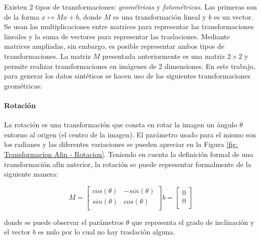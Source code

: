 			Existen 2 tipos de transformaciones: \textit{geométricas} y \textit{fotométricas}. Las primeras son de la forma $x\mapsto Mx + b$, donde $M$ es una transformación lineal y $b$ es un vector. Se usan las multiplicaciones entre matrices para representar las transformaciones lineales y la suma de vectores para representar las traslaciones. Mediante matrices ampliadas, sin embargo, es posible representar ambos tipos de transformaciones.	La matriz $M$ presentada anteriormente es una matriz $2\times 2$ y permite realizar transformaciones en imágenes de 2 dimensiones. En este trabajo, para generar los datos sintéticos se hacen uso de las siguientes transformaciones geométricas:
			
			\paragraph{Rotación}
			
				La rotación es una transformación que consta en rotar la imagen un ángulo $\theta$ entorno al origen (el centro de la imagen). El parámetro usado para el mismo son los radianes y las diferentes variaciones se pueden apreciar en la Figura \ref{fig: Transformacion Afin - Rotacion}. Teniendo en cuenta la definición formal de una transformación afín anterior, la rotación se puede representar formalmente de la siguiente manera:

			\begin{equation*}
					M =  
					\begin{bmatrix}
						cos(\theta) & -sin(\theta) \\
						sin(\theta) & cos(\theta)  \\
					\end{bmatrix}
					b =
					\begin{bmatrix}
						0 \\
						0 \\
					\end{bmatrix}	
			\end{equation*}

	donde se puede observar el parámetros $\theta$ que representa el grado de inclinación y el vector $b$ es nulo por lo cual no hay traslación alguna.

